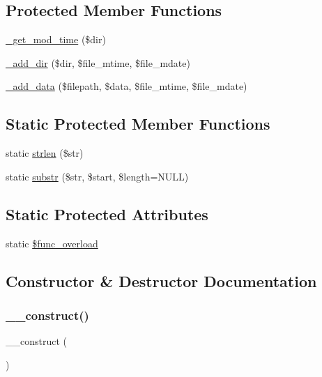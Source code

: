 \subsection*{Protected Member Functions}
\begin{DoxyCompactItemize}
\item 
\mbox{\hyperlink{class_c_i___zip_a2e4a669b246619934060ea323b99b332}{\+\_\+get\+\_\+mod\+\_\+time}} (\$dir)
\item 
\mbox{\hyperlink{class_c_i___zip_aacd1bc7175638298e01bd6c16bccfbe6}{\+\_\+add\+\_\+dir}} (\$dir, \$file\+\_\+mtime, \$file\+\_\+mdate)
\item 
\mbox{\hyperlink{class_c_i___zip_a4ff8a5ea57979ec1a44cc9e443acf26d}{\+\_\+add\+\_\+data}} (\$filepath, \$data, \$file\+\_\+mtime, \$file\+\_\+mdate)
\end{DoxyCompactItemize}
\subsection*{Static Protected Member Functions}
\begin{DoxyCompactItemize}
\item 
static \mbox{\hyperlink{class_c_i___zip_a4c29a687d4ed62c26a10e41d98930d5f}{strlen}} (\$str)
\item 
static \mbox{\hyperlink{class_c_i___zip_a101caef57ef0b165da5747e2c2e6c9dc}{substr}} (\$str, \$start, \$length=N\+U\+LL)
\end{DoxyCompactItemize}
\subsection*{Static Protected Attributes}
\begin{DoxyCompactItemize}
\item 
static \mbox{\hyperlink{class_c_i___zip_aef84be58d58a5895572c5689e56a1047}{\$func\+\_\+overload}}
\end{DoxyCompactItemize}


\subsection{Constructor \& Destructor Documentation}
\mbox{\label{class_c_i___zip_a095c5d389db211932136b53f25f39685}} 
\subsubsection{\texorpdfstring{\+\_\+\+\_\+construct()}{\_\_construct()}}
{\footnotesize\ttfamily \+\_\+\+\_\+construct (\begin{DoxyParamCaption}{ }\end{DoxyParamCaption})}

